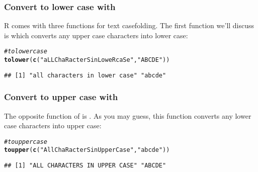 \documentclass[12pt]{beamer}\usepackage[]{graphicx}\usepackage[]{color}
\makeatletter
\newcommand{\hlstr}[1]{\textcolor[rgb]{0.192,0.494,0.8}{#1}}%
\newcommand{\hlcom}[1]{\textcolor[rgb]{0.678,0.584,0.686}{\textit{#1}}}%
\newcommand{\hlstd}[1]{\textcolor[rgb]{0.345,0.345,0.345}{#1}}%
\newcommand{\hlkwd}[1]{\textcolor[rgb]{0.737,0.353,0.396}{\textbf{#1}}}%
\newenvironment{kframe}{%
 \def\at@end@of@kframe{}%
 \ifinner\ifhmode%
  \def\at@end@of@kframe{\end{minipage}}%
  \begin{minipage}{\columnwidth}%
 \fi\fi%
 \def\FrameCommand##1{\hskip\@totalleftmargin \hskip-\fboxsep
 \colorbox{shadecolor}{##1}\hskip-\fboxsep
     \hskip-\linewidth \hskip-\@totalleftmargin \hskip\columnwidth}%
 \MakeFramed {\advance\hsize-\width
   \@totalleftmargin\z@ \linewidth\hsize
   \@setminipage}}%
 {\par\unskip\endMakeFramed%
 \at@end@of@kframe}
\newenvironment{knitrout}{}{} %
\makeatother
\begin{document}

\begin{frame}[fragile]
\frametitle{Convert to lower case with }

R comes with three functions for text casefolding. The first function we'll discuss is  which converts any upper case characters into lower case:
\begin{knitrout}\footnotesize
{}\color{fgcolor}\begin{kframe}
\begin{alltt}
\hlcom{# to lower case}
\hlkwd{tolower}\hlstd{(}\hlkwd{c}\hlstd{(}\hlstr{"aLL ChaRacterS in LoweR caSe"}\hlstd{,} \hlstr{"ABCDE"}\hlstd{))}
\end{alltt}
\begin{verbatim}
## [1] "all characters in lower case" "abcde"
\end{verbatim}
\end{kframe}
\end{knitrout}

\end{frame}


\begin{frame}[fragile]
\frametitle{Convert to upper case with }

The opposite function of  is . As you may guess, this function converts any lower case characters into upper case:
\begin{knitrout}\footnotesize
{}\color{fgcolor}\begin{kframe}
\begin{alltt}
\hlcom{# to upper case}
\hlkwd{toupper}\hlstd{(}\hlkwd{c}\hlstd{(}\hlstr{"All ChaRacterS in Upper Case"}\hlstd{,} \hlstr{"abcde"}\hlstd{))}
\end{alltt}
\begin{verbatim}
## [1] "ALL CHARACTERS IN UPPER CASE" "ABCDE"
\end{verbatim}
\end{kframe}
\end{knitrout}

\end{frame}

\end{document}
